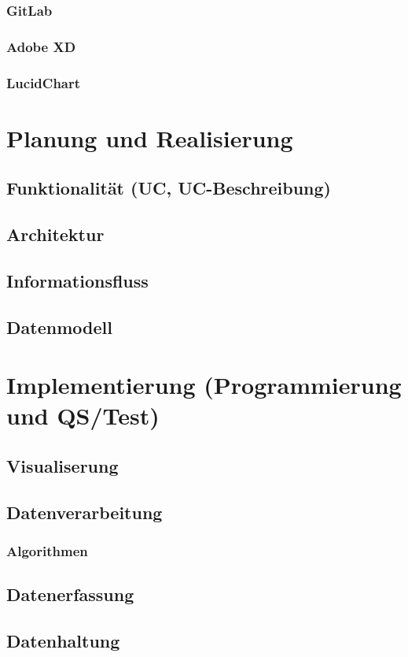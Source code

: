 \documentclass[pdftex,11pt,a4paper]{book}
\begin{document}
\subsection{GitLab}
\subsection{Adobe XD}
\subsection{LucidChart}

\chapter{Planung und Realisierung}
\section{Funktionalität (UC, UC-Beschreibung)}
\section{Architektur}
\section{Informationsfluss}
\section{Datenmodell}

\chapter{Implementierung (Programmierung und QS/Test)}
\section{Visualiserung}
\section{Datenverarbeitung}
\subsection{Algorithmen}
\section{Datenerfassung}
\section{Datenhaltung}
\end{document}
